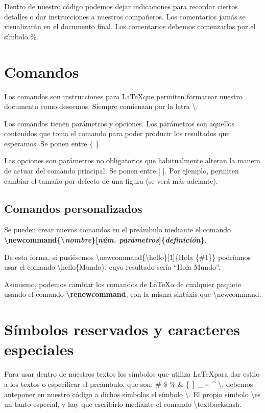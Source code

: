 \documentclass[12pt]{book} %
\begin{document}
Dentro de nuestro código podemos dejar indicaciones para recordar ciertos detalles o dar instrucciones a nuestros compañeros. Los comentarios jamás se visualizarán en el documento final. Los comentarios debemos comenzarlos por el símbolo \%.

\section{Comandos}

Los comandos son instrucciones para \LaTeX que permiten formatear nuestro documento como deseemos. Siempre comienzan por la letra \textbackslash.

Los comandos tienen parámetros y opciones. Los parámetros son aquellos contenidos que toma el comando para poder producir los resultados que esperamos. Se ponen entre \{ \}.

Las opciones son parámetros no obligatorios que habitualmente alteran la manera de actuar del comando principal. Se ponen entre [ ]. Por ejemplo, permiten cambiar el tamaño por defecto de una figura (se verá más adelante).

\subsection{Comandos personalizados}

Se pueden crear nuevos comandos en el preámbulo mediante el comando \textbf{\textbackslash newcommand\{\textbackslash \emph{nombre}\}[\emph{núm. parámetros}]\{\emph{definición}\}}.

De esta forma, si pusiésemos \textbackslash newcommand\{\textbackslash hello\}[1]\{Hola \{\#1\}\} podríamos usar el comando \textbackslash hello\{Mundo\}, cuyo resultado sería ``Hola Mundo''.

Asimismo, podemos cambiar los comandos de \LaTeX o de cualquier paquete usando el comando \textbf{\textbackslash renewcommand}, con la misma sintáxis que \textbackslash newcommand.

\section{Símbolos reservados y caracteres especiales}

Para usar dentro de nuestros textos los símbolos que utiliza \LaTeX para dar estilo a los textos o especificar el preámbulo, que son: \# \$ \% \& \{ \} \_ \~{} \^{} \textbackslash, debemos anteponer en nuestro código a dichos símbolos el símbolo \textbackslash. El propio símbolo \textbackslash es un tanto especial, y hay que escribirlo mediante el comando \textbackslash textbackslash.
\end{document}
